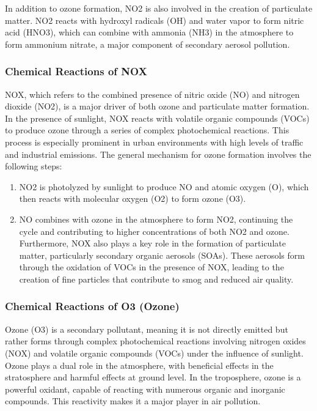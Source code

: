\documentclass{modeleRapport}
\begin{document}
In addition to ozone formation, NO2 is also involved in the creation of particulate matter. NO2 reacts with hydroxyl 
radicals (OH) and water vapor to form nitric acid (HNO3), which can combine with ammonia (NH3) in the atmosphere to form 
ammonium nitrate, a major component of secondary aerosol pollution.\\

\subsubsection{Chemical Reactions of NOX}

NOX, which refers to the combined presence of nitric oxide (NO) and nitrogen dioxide (NO2), is a major driver of both ozone 
and particulate matter formation. In the presence of sunlight, NOX reacts with volatile organic compounds (VOCs) to produce 
ozone through a series of complex photochemical reactions. This process is especially prominent in urban environments with 
high levels of traffic and industrial emissions. The general mechanism for ozone formation involves the following steps:
\begin{enumerate}
    \item NO2 is photolyzed by sunlight to produce NO and atomic oxygen (O), which then reacts with molecular oxygen (O2) 
    to form ozone (O3).
    \item NO combines with ozone in the atmosphere to form NO2, continuing the cycle and contributing to higher 
    concentrations of both NO2 and ozone. Furthermore, NOX also plays a key role in the formation of particulate matter, 
    particularly secondary organic aerosols (SOAs). These aerosols form through the oxidation of VOCs in the presence of NOX, 
    leading to the creation of fine particles that contribute to smog and reduced air quality.\\
\end{enumerate}


\subsubsection{Chemical Reactions of O3 (Ozone)}

Ozone (O3) is a secondary pollutant, meaning it is not directly emitted but rather forms through complex photochemical 
reactions involving nitrogen oxides (NOX) and volatile organic compounds (VOCs) under the influence of sunlight. Ozone 
plays a dual role in the atmosphere, with beneficial effects in the stratosphere and harmful effects at ground level. In the 
troposphere, ozone is a powerful oxidant, capable of reacting with numerous organic and inorganic compounds. This reactivity 
makes it a major player in air pollution.\\
\end{document}
